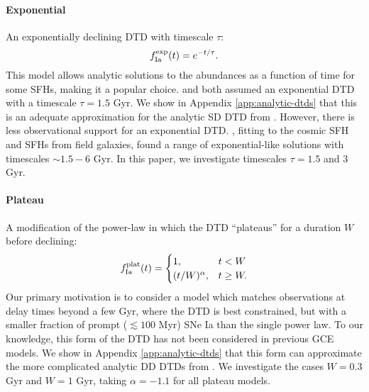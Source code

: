 \documentclass[twocolumn,twocolappendix,linenumbers]{aastex631}
\begin{document}
\paragraph{Exponential} An exponentially declining DTD with timescale $\tau$:
\begin{equation}
    f_{\rm Ia}^{\rm exp}(t) = e^{-t/\tau}.
    \label{eq:exponential-dtd}
\end{equation}
This model allows analytic solutions to the abundances as a function of time for some SFHs, making it a popular choice. \citet{Schonrich2009-RadialMixing} and \citet{Weinberg2017-ChemicalEquilibrium} both assumed an exponential DTD with a timescale $\tau=1.5$ Gyr. We show in Appendix \ref{app:analytic-dtds} that this is an adequate approximation for the analytic SD DTD from \citet{Greggio2005-AnalyticalRates}. However, there is less observational support for an exponential DTD. \citet{Strolger2020-ExponentialDTD}, fitting to the cosmic SFH and SFHs from field galaxies, found a range of exponential-like solutions with timescales $\sim 1.5 - 6$ Gyr.
In this paper, we investigate timescales $\tau=1.5$ and 3 Gyr.

\paragraph{Plateau} A modification of the power-law in which the DTD ``plateaus'' for a duration $W$ before declining:
\begin{equation}
    f_{\rm Ia}^{\rm plat}(t) =
    \begin{cases}
        1, & t < W \\
        (t/W)^\alpha, & t \ge W.
    \end{cases}
    \label{eq:plateau-dtd}
\end{equation}
Our primary motivation is to consider a model which matches observations at delay times beyond a few Gyr, where the DTD is best constrained, but with a smaller fraction of prompt ($\lesssim 100$ Myr) SNe Ia than the single power law. To our knowledge, this form of the DTD has not been considered in previous GCE models. We show in Appendix \ref{app:analytic-dtds} that this form can approximate the more complicated analytic DD DTDs from \citet{Greggio2005-AnalyticalRates}. We investigate the cases $W=0.3$ Gyr and $W=1$ Gyr, taking $\alpha=-1.1$ for all plateau models.
\end{document}
